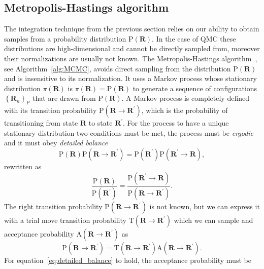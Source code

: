 \documentclass[final,3p,times,twocolumn]{elsarticle}
\begin{document}
	\subsection{Metropolis-Hastings algorithm}
		\label{subsec:Impl-MCMC}
	The integration technique from the previous section relies on our ability to obtain samples from a probability distribution $\mathrm{P}(\mathbf{R})$. In the case of QMC these distributions are high-dimensional and cannot be directly sampled from, moreover their normalizations are usually not known. 
	The Metropolis-Hastings algorithm~\cite{hastings1970monte}, see Algorithm~\ref{alg:MCMC}, avoids direct sampling from the distribution $\mathrm{P}(\mathbf{R})$ and is insensitive to its normalization. It uses a Markov process whose stationary distribution $\pi(\mathbf{R})$ is $\pi(\mathbf{R}) = \mathrm{P}(\mathbf{R})$	
	to generate a sequence of configurations $\left\{\mathbf{R}_n\right\}_\mathrm{P}$ 
	that are drawn from $\mathrm{P}(\mathbf{R})$. A Markov process is completely defined with its transition probability $\mathrm{P}(\mathbf{R} \rightarrow \mathbf{R}^\prime)$, which is the probability of transitioning from state $\mathbf{R}$ to state $\mathbf{R}^\prime$. For the process to have a unique stationary distribution two conditions must be met, the process must be \emph{ergodic} and it must obey \emph{detailed balance}
	\begin{equation}
		\mathrm{P}(\mathbf{R}) \mathrm P(\mathbf{R} \rightarrow \mathbf{R}^\prime) = \mathrm{P}(\mathbf{R}^\prime) \mathrm P(\mathbf{R}^\prime \rightarrow \mathbf{R}),
	\end{equation}
	rewritten as
	\begin{equation}
		\label{eq:detailed_balance}
		\frac{\mathrm P ({\mathbf{R}})}{\mathrm P ({\mathbf{R}^\prime})} = \frac{\mathrm P(\mathbf{R}^\prime \rightarrow \mathbf{R})}{\mathrm P(\mathbf{R} \rightarrow \mathbf{R}^\prime)}.
	\end{equation}
	The right transition probability $\mathrm P(\mathbf{R} \rightarrow \mathbf{R}^\prime)$ is not known, but we can express it with a trial move transition probability $\mathrm{T}(\mathbf{R} \rightarrow \mathbf{R}^\prime)$ which we can sample and acceptance probability $\mathrm{A}(\mathbf{R} \rightarrow \mathbf{R}^\prime)$ as
	\begin{equation}
		\mathrm P(\mathbf{R} \rightarrow \mathbf{R}^\prime) = \mathrm T(\mathbf{R} \rightarrow \mathbf{R}^\prime) \mathrm A(\mathbf{R} \rightarrow \mathbf{R}^\prime).
	\end{equation}
	For equation~\eqref{eq:detailed_balance} to hold, the acceptance probability must be 
\end{document}
